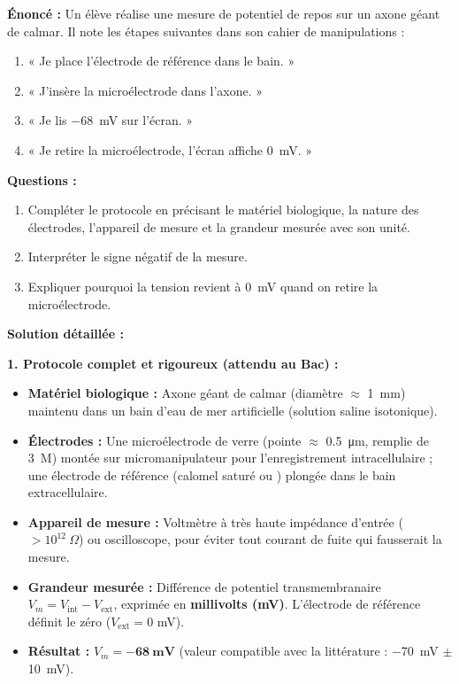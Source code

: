\documentclass[11pt]{article}
\begin{document}
\begin{exoresolu}
\textbf{Énoncé :} Un élève réalise une mesure de potentiel de repos sur un axone géant de calmar. Il note les étapes suivantes dans son cahier de manipulations :
\begin{enumerate}
    \item « Je place l'électrode de référence dans le bain. »
    \item « J'insère la microélectrode dans l'axone. »
    \item « Je lis \SI{-68}{mV} sur l'écran. »
    \item « Je retire la microélectrode, l'écran affiche \SI{0}{mV}. »
\end{enumerate}
\textbf{Questions :}
\begin{enumerate}
    \item Compléter le protocole en précisant le matériel biologique, la nature des électrodes, l'appareil de mesure et la grandeur mesurée avec son unité.
    \item Interpréter le signe négatif de la mesure.
    \item Expliquer pourquoi la tension revient à \SI{0}{mV} quand on retire la microélectrode.
\end{enumerate}

\tcblower
\textbf{Solution détaillée :}

\textbf{1. Protocole complet et rigoureux (attendu au Bac) :}
\begin{itemize}
    \item \textbf{Matériel biologique :} Axone géant de calmar (diamètre $\approx$ \SI{1}{mm}) maintenu dans un bain d'eau de mer artificielle (solution saline isotonique).
    \item \textbf{Électrodes :} Une microélectrode de verre (pointe $\approx$ \SI{0,5}{\micro\metre}, remplie de  \SI{3}{M}) montée sur micromanipulateur pour l'enregistrement intracellulaire ; une électrode de référence (calomel saturé ou ) plongée dans le bain extracellulaire.
    \item \textbf{Appareil de mesure :} Voltmètre à très haute impédance d'entrée ($> 10^{12}\ \Omega$) ou oscilloscope, pour éviter tout courant de fuite qui fausserait la mesure.
    \item \textbf{Grandeur mesurée :} Différence de potentiel transmembranaire $V_m = V_{\text{int}} - V_{\text{ext}}$, exprimée en \textbf{millivolts (mV)}. L'électrode de référence définit le zéro ($V_{\text{ext}} = 0$ mV).
    \item \textbf{Résultat :} $V_m = \mathbf{-68\ mV}$ (valeur compatible avec la littérature : \SI{-70}{mV} $\pm$ \SI{10}{mV}).
\end{itemize}


\end{exoresolu}
\end{document}
